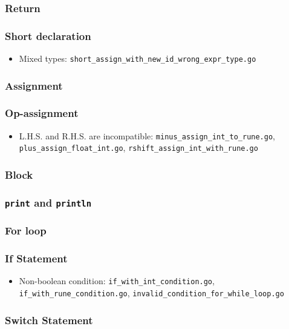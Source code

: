\documentclass{article}
\begin{document}
\subsubsection*{Return}
\subsubsection*{Short declaration}

\begin{itemize}
\item Mixed types: \texttt{short_assign_with_new_id_wrong_expr_type.go}
\end{itemize}

\subsubsection*{Assignment}
\subsubsection*{Op-assignment}

\begin{itemize}
\item L.H.S. and R.H.S. are incompatible: \texttt{minus_assign_int_to_rune.go}, \texttt{plus_assign_float_int.go}, \texttt{rshift_assign_int_with_rune.go}
\end{itemize}

\subsubsection*{Block}
\subsubsection*{\texttt{print} and \texttt{println}}
\subsubsection*{For loop}
\subsubsection*{If Statement}

\begin{itemize}
\item Non-boolean condition: \texttt{if_with_int_condition.go}, \texttt{if_with_rune_condition.go}, \texttt{invalid_condition_for_while_loop.go}
\end{itemize}

\subsubsection*{Switch Statement}
\end{document}
